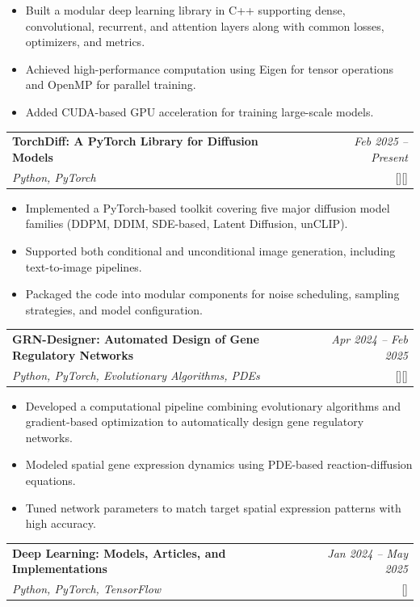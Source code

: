 \documentclass[a4paper,11pt]{article}
\makeatletter
\newcommand{\resumeProject}[4]{
\vspace{0.5mm}\item
    \begin{tabular*}{0.98\textwidth}[t]{l@{\extracolsep{\fill}}r}
        \textbf{#1} & \textit{\footnotesize{#3}} \\
        \footnotesize{\textit{#2}} & \footnotesize{#4}
    \end{tabular*}
    \vspace{-2.4mm}
}
\newcommand{\resumeItemListStart}{\begin{itemize}[leftmargin=*,labelsep=1mm,itemsep=0.5mm]}
\newcommand{\resumeItemListEnd}{\end{itemize}\vspace{-2mm}}
\makeatother
\begin{document}
   \resumeItemListStart 
   \item Built a modular deep learning library in C++ supporting dense, convolutional, recurrent, and attention layers along with common losses, optimizers, and metrics.
   \item Achieved high-performance computation using Eigen for tensor operations and OpenMP for parallel training.
   \item Added CUDA-based GPU acceleration for training large-scale models.
\resumeItemListEnd


\resumeProject
   {TorchDiff: A PyTorch Library for Diffusion Models}
   {Python, PyTorch} 
   {Feb 2025 -- Present} {[\href{https://loqmansamani.github.io/torchdiff/}{\textcolor{darkblue}{\faGlobe}}][\href{https://github.com/LoqmanSamani/TorchDiff}{\textcolor{darkblue}{\faGithub}}]} 
   
   \resumeItemListStart 
   \item Implemented a PyTorch-based toolkit covering five major diffusion model families (DDPM, DDIM, SDE-based, Latent Diffusion, unCLIP).
   \item Supported both conditional and unconditional image generation, including text-to-image pipelines.
   \item Packaged the code into modular components for noise scheduling, sampling strategies, and model configuration.
\resumeItemListEnd


\resumeProject
  {GRN-Designer: Automated Design of Gene Regulatory Networks}
  {Python, PyTorch, Evolutionary Algorithms, PDEs}
  {Apr 2024 -- Feb 2025}
  {[\href{https://loqmansamani.github.io/grn-designer/}{\textcolor{darkblue}{\faGlobe}}][\href{https://github.com/LoqmanSamani/grn-designer}{\textcolor{darkblue}{\faGithub}}]}  

\resumeItemListStart
  \item Developed a computational pipeline combining evolutionary algorithms and gradient-based optimization to automatically design gene regulatory networks.
  \item Modeled spatial gene expression dynamics using PDE-based reaction-diffusion equations.
  \item Tuned network parameters to match target spatial expression patterns with high accuracy.
\resumeItemListEnd



\resumeProject
  {Deep Learning: Models, Articles, and Implementations}
  {Python, PyTorch, TensorFlow}
  {Jan 2024 -- May 2025}
  {{}[\href{https://github.com/LoqmanSamani/deep-learning}{\textcolor{darkblue}{\faGithub}}]}  
\end{document}
